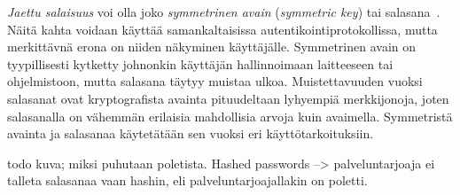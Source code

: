 \documentclass[finnish,gradu]{tktltiki}
\begin{document}
  \emph{Jaettu salaisuus} voi olla joko \emph{symmetrinen avain} (\emph{symmetric key}) tai salasana~\cite{NIST_SP800-63-1}. Näitä kahta voidaan käyttää samankaltaisissa autentikointiprotokollissa, mutta merkittävnä erona on niiden näkyminen käyttäjälle. Symmetrinen avain on tyypillisesti kytketty johnonkin käyttäjän hallinnoimaan laitteeseen tai ohjelmistoon, mutta salasana täytyy muistaa ulkoa. Muistettavuuden vuoksi salasanat ovat kryptografista avainta pituudeltaan lyhyempiä merkkijonoja, joten salasanalla on vähemmän erilaisia mahdollisia arvoja kuin avaimella. Symmetristä avainta ja salasanaa käytetätään sen vuoksi eri käyttötarkoituksiin.

  todo kuva; miksi puhutaan poletista. Hashed passwords --> palveluntarjoaja ei talleta salasanaa vaan hashin, eli palveluntarjoajallakin on poletti.

\end{document}
